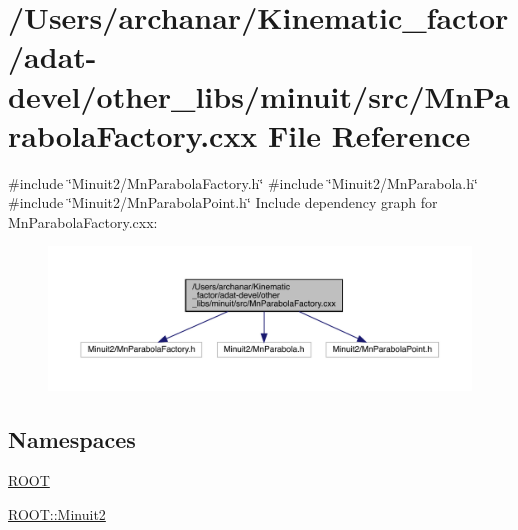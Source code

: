 \hypertarget{adat-devel_2other__libs_2minuit_2src_2MnParabolaFactory_8cxx}{}\section{/\+Users/archanar/\+Kinematic\+\_\+factor/adat-\/devel/other\+\_\+libs/minuit/src/\+Mn\+Parabola\+Factory.cxx File Reference}
\label{adat-devel_2other__libs_2minuit_2src_2MnParabolaFactory_8cxx}
{\ttfamily \#include \char`\"{}Minuit2/\+Mn\+Parabola\+Factory.\+h\char`\"{}}\newline
{\ttfamily \#include \char`\"{}Minuit2/\+Mn\+Parabola.\+h\char`\"{}}\newline
{\ttfamily \#include \char`\"{}Minuit2/\+Mn\+Parabola\+Point.\+h\char`\"{}}\newline
Include dependency graph for Mn\+Parabola\+Factory.\+cxx\+:
\nopagebreak
\begin{figure}[H]
\begin{center}
\leavevmode
\includegraphics[width=350pt]{d1/d95/adat-devel_2other__libs_2minuit_2src_2MnParabolaFactory_8cxx__incl}
\end{center}
\end{figure}
\subsection*{Namespaces}
\begin{DoxyCompactItemize}
\item 
 \mbox{\hyperlink{namespaceROOT}{R\+O\+OT}}
\item 
 \mbox{\hyperlink{namespaceROOT_1_1Minuit2}{R\+O\+O\+T\+::\+Minuit2}}
\end{DoxyCompactItemize}
